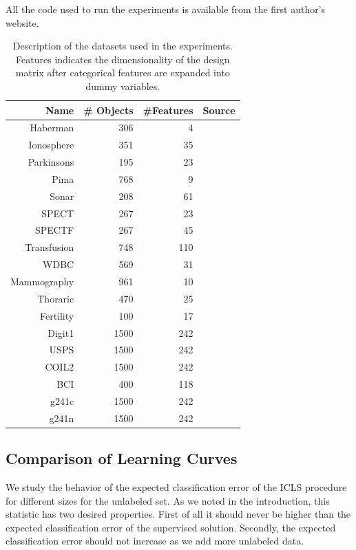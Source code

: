 \documentclass{elsarticle}
\begin{document}
All the code used to run the experiments is available from the first author's website.

\begin{table}[ht] 
\caption{Description of the datasets used in the experiments. Features indicates the dimensionality of the design matrix after categorical features are expanded into dummy variables.}
\begin{center}
\begin{tabular}{rrrr}
  \hline
 Name & \# Objects & \#Features & Source \\ 
  \hline
  Haberman & 306 &   4 & \cite{Bache2013} \\ 
  Ionosphere & 351 &  35 & \cite{Bache2013} \\ 
  Parkinsons & 195 &  23 & \cite{Bache2013} \\ 
  Pima & 768 &   9 & \cite{Bache2013} \\ 
  Sonar & 208 &  61 & \cite{Bache2013} \\ 
  SPECT & 267 &  23 & \cite{Bache2013} \\ 
  SPECTF & 267 &  45 & \cite{Bache2013} \\ 
  Transfusion & 748 &   110 & \cite{Bache2013} \\ 
  WDBC & 569 &  31 & \cite{Bache2013} \\
  Mammography & 961 & 10 & \cite{Bache2013} \\
  Thoraric & 470 & 25 & \cite{Bache2013} \\
  Fertility & 100 & 17 & \cite{Bache2013} \\
  Digit1 & 1500 & 242 & \cite{Chapelle2006} \\ 
  USPS & 1500 & 242 & \cite{Chapelle2006}  \\ 
  COIL2 & 1500 & 242 & \cite{Chapelle2006} \\ 
  BCI & 400 & 118 & \cite{Chapelle2006} \\ 
  g241c & 1500 & 242 & \cite{Chapelle2006} \\ 
  g241n & 1500 & 242 & \cite{Chapelle2006} \\ 
   \hline
\end{tabular}
\end{center}

\label{table:datasets}
\end{table}

\subsection{Comparison of Learning Curves}
We study the behavior of the expected classification error of the ICLS procedure for different sizes for the unlabeled set. As we noted in the introduction, this statistic has two desired properties. First of all it should never be higher than the expected classification error of the supervised solution. Secondly, the expected classification error should not increase as we add more unlabeled data. 
\end{document}
